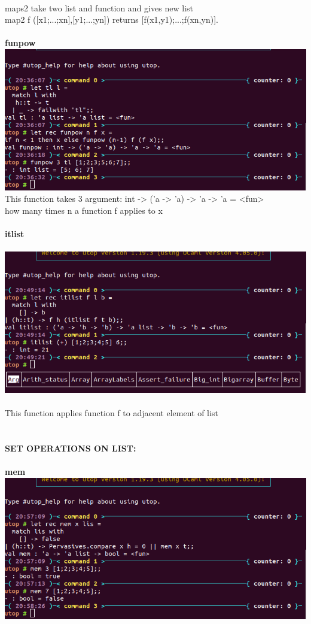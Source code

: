 \documentclass{article}
\begin{document}
\\
maps2 take two list and function and gives new list\\
map2 f ([x1;...;xn],[y1;...;yn]) returns [f(x1,y1);...;f(xn,yn)].\\
\\
\textbf{funpow}
\\
\includegraphics{images/image11.png}
\\
This function takes 3 argument: int -> ('a -> 'a) -> 'a -> 'a = <fun>\\
how many times n a function f applies to x
\\
\\
\textbf{itlist}
\\
\\
\includegraphics{images/image2.png}
\\
\\
This function applies function f to adjacent element of list\\
\\
\\
\textbf{SET OPERATIONS ON LIST:
}\\
\\
\textbf{mem}\\
\includegraphics{images/image7.png}
\end{document}
